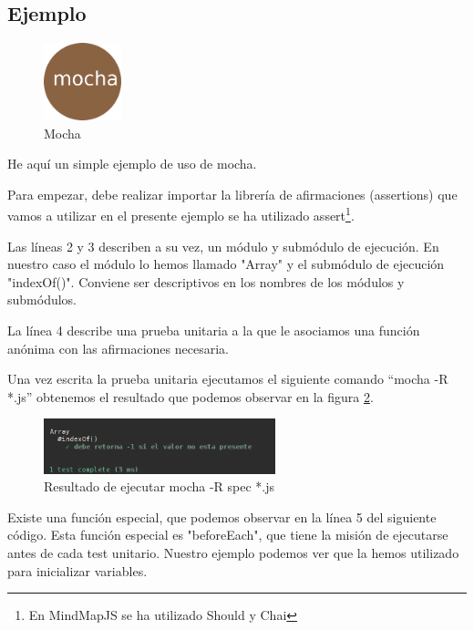 \subsection{Ejemplo}

\begin{figure}
  \begin{center}
    \includegraphics[width=0.2\textwidth]{imagenes/mocha-logo}
  \end{center}
  \caption{Mocha}
	\label{fig:mocha}
\end{figure}


He aquí un simple ejemplo de uso de mocha. 




Para empezar, debe realizar importar la librería de afirmaciones (assertions) que vamos a utilizar en el presente ejemplo se ha utilizado assert\footnote{En MindMapJS se ha utilizado Should y Chai}. 

Las líneas 2 y 3 describen a su vez, un módulo y submódulo de ejecución. En nuestro caso el módulo lo hemos llamado "Array" y el submódulo de ejecución "indexOf()". Conviene ser descriptivos en los nombres de los módulos y submódulos. 

La línea 4 describe una prueba unitaria a la que le asociamos una función anónima con las afirmaciones necesaria.

Una vez escrita la prueba unitaria ejecutamos el siguiente comando “mocha -R *.js” obtenemos el resultado que podemos observar en la figura \ref{fig:mochaejecucion}.

\begin{figure}[htbp]
\centering
\includegraphics[width=0.6\textwidth]{imagenes/mochaejecucion}
\caption{Resultado de ejecutar mocha -R spec *.js}
\label{fig:mochaejecucion}
\end{figure}

Existe una función especial, que podemos observar en la línea 5 del siguiente código. Esta función especial es "beforeEach", que tiene la misión de ejecutarse antes de cada test unitario. Nuestro ejemplo podemos ver que la hemos utilizado para inicializar variables.

